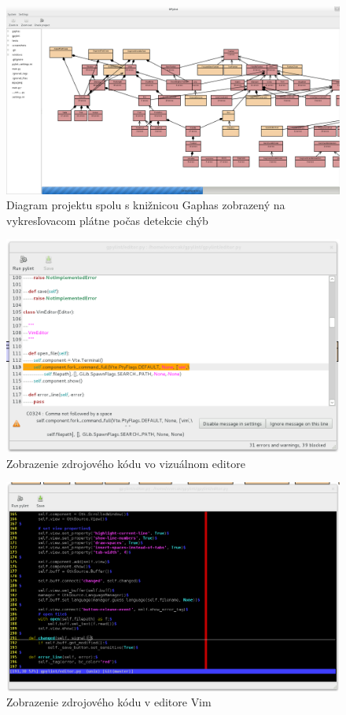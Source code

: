 \documentclass[11pt,oneside,final]{fithesis2}
\begin{document}
	\begin{figure}[htb]
	 \centering
	 \includegraphics[width=\textwidth]{images/gpylint}
	 \caption{Diagram projektu spolu s knižnicou Gaphas zobrazený na vykresľovacom plátne počas detekcie chýb}
	\end{figure}

	\begin{figure}[htb]
	 \centering
	 \includegraphics[width=\textwidth]{images/code_window}
	 \caption{Zobrazenie zdrojového kódu vo vizuálnom editore}
	\end{figure}
			    
	\begin{figure}[htb]
	 \centering
	 \includegraphics[width=\textwidth]{images/vim_editor}
	 \caption{Zobrazenie zdrojového kódu v editore Vim}
	\end{figure}
	
\end{document}
